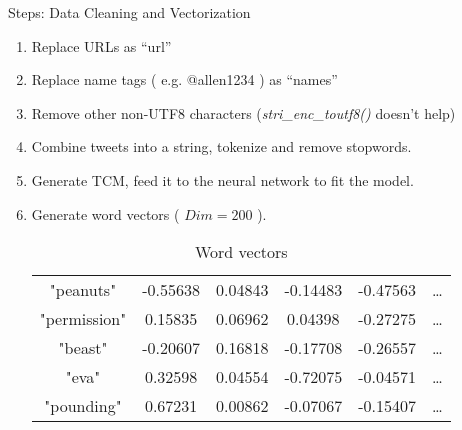 \documentclass{beamer}
\begin{document}
\begin{frame}{Steps: Data Cleaning and Vectorization}
	\begin{enumerate}
		\item Replace URLs as ``url''
		\item Replace name tags ( e.g. @allen1234 ) as ``names''
		\item Remove other non-UTF8 characters (\textit{stri\_enc\_toutf8()} doesn't help)
		\item Combine tweets into a string, tokenize and remove stopwords.
		\item Generate TCM, feed it to the neural network to fit the model.
		\item Generate word vectors ( $Dim = 200 $ ).
	\begin{table}[htpb]
		\scriptsize
		\centering
		\caption{Word vectors}
		\label{tab:wordVec}
		\begin{tabular}{c | c c c c c}
			"peanuts" & -0.55638 & 0.04843 & -0.14483 & -0.47563 & \ldots \\
			"permission" & 0.15835 & 0.06962 & 0.04398 & -0.27275 & \ldots \\ 
			"beast" & -0.20607 & 0.16818 & -0.17708 & -0.26557 & \ldots \\
			"eva" & 0.32598 & 0.04554 & -0.72075 & -0.04571 & \ldots \\
			"pounding" & 0.67231 & 0.00862 & -0.07067 & -0.15407 & \ldots \\
		\end{tabular}
	\end{table}
	\end{enumerate}
\end{frame}
\end{document}
